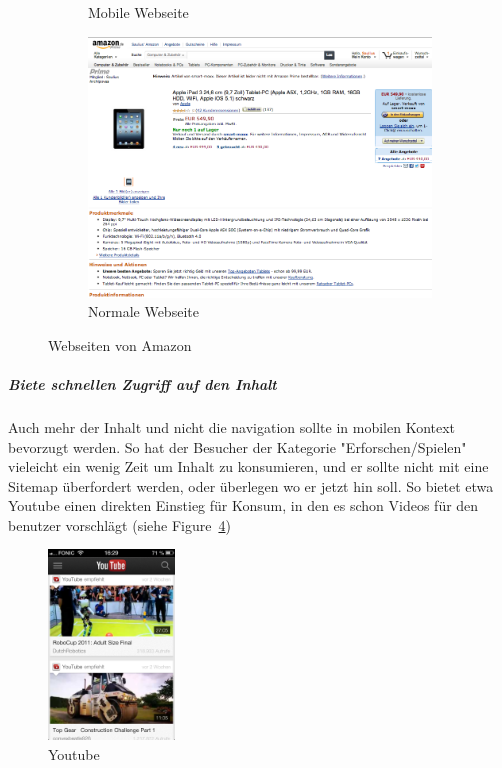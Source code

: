 \begin{figure}
\begin{subfigure}[b]{0.3\textwidth}
		\caption{Mobile Webseite}\label{fig:amazon}
	\end{subfigure}
	\begin{subfigure}[b]{0.6\textwidth}
		\centering
		\includegraphics[width=1\textwidth]{img/amazonFull.png}
		\caption{Normale Webseite}\label{fig:amazonFull}
	\end{subfigure}
	\caption{Webseiten von Amazon}\label{fig:amazonSites}
\end{figure}

\subparagraph{Biete schnellen Zugriff auf den Inhalt} 
\label{subp:entferne_das_fett} 

Auch mehr der Inhalt und nicht die navigation sollte in mobilen Kontext bevorzugt werden\cite[Seite 52]{mobileFirst}. So hat der Besucher der Kategorie "Erforschen/Spielen" vieleicht ein wenig Zeit um Inhalt zu konsumieren, und er sollte nicht mit eine Sitemap überfordert werden, oder überlegen wo er jetzt hin soll. So bietet etwa Youtube einen direkten Einstieg für Konsum, in den es schon Videos für den benutzer vorschlägt (siehe Figure~\ref{fig:youtube})

\begin{figure}
	\begin{center}
	\includegraphics[width=0.3\textwidth]{img/youtube.png}
	\caption{Youtube}\label{fig:youtube}
\end{center}
\end{figure}


